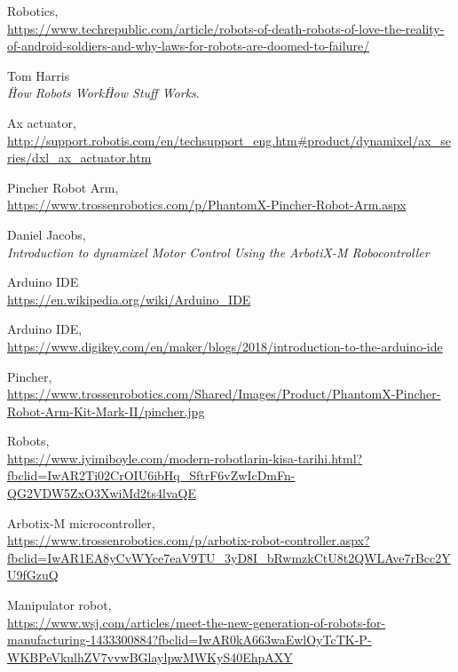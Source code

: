 \begin{thebibliography}{9}

	Robotics,
	\\\url{https://www.techrepublic.com/article/robots-of-death-robots-of-love-the-reality-of-android-soldiers-and-why-laws-for-robots-are-doomed-to-failure/}
	
	Tom Harris\\
	\textit{\"How Robots Work\" How Stuff Works}. 	

	Ax actuator,
	\\\url{http://support.robotis.com/en/techsupport_eng.htm#product/dynamixel/ax_series/dxl_ax_actuator.htm}
	
	Pincher Robot Arm,
	\\\url{https://www.trossenrobotics.com/p/PhantomX-Pincher-Robot-Arm.aspx}
	
	Daniel Jacobs,\\
	\textit{Introduction to dynamixel Motor Control Using the ArbotiX-M Robocontroller}

	Arduino IDE
	\\\url{https://en.wikipedia.org/wiki/Arduino_IDE}
	

	Arduino IDE,
	\\\url{https://www.digikey.com/en/maker/blogs/2018/introduction-to-the-arduino-ide}
	
	Pincher,
	\\\url{https://www.trossenrobotics.com/Shared/Images/Product/PhantomX-Pincher-Robot-Arm-Kit-Mark-II/pincher.jpg}

	Robots,
	\\\url{https://www.iyimiboyle.com/modern-robotlarin-kisa-tarihi.html?fbclid=IwAR2Ti02CrOIU6ibHq_SftrF6vZwIcDmFn-QG2VDW5ZxO3XwiMd2ts4lvaQE}

	Arbotix-M microcontroller,
	\\\url{https://www.trossenrobotics.com/p/arbotix-robot-controller.aspx?fbclid=IwAR1EA8yCvWYce7eaV9TU_3yD8I_bRwmzkCtU8t2QWLAve7rBcc2YU9fGzuQ}

	Manipulator robot,
	\\\url{https://www.wsj.com/articles/meet-the-new-generation-of-robots-for-manufacturing-1433300884?fbclid=IwAR0kA663waEwlOyTcTK-P-WKBPeVkulhZV7vvwBGlaylpwMWKyS40EhpAXY}

\end{thebibliography}